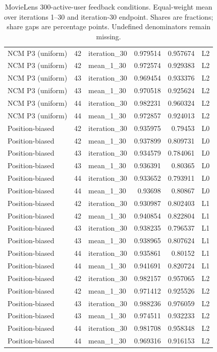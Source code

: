 \begin{table}[htbp!]
\begin{tabular}{lrlrrl}
NCM P3 (uniform) & 42 & iteration\_30 & 0.979514 & 0.957674 & L2 \\
NCM P3 (uniform) & 42 & mean\_1\_30 & 0.972574 & 0.929383 & L2 \\
NCM P3 (uniform) & 43 & iteration\_30 & 0.969454 & 0.933376 & L2 \\
NCM P3 (uniform) & 43 & mean\_1\_30 & 0.970518 & 0.925624 & L2 \\
NCM P3 (uniform) & 44 & iteration\_30 & 0.982231 & 0.960324 & L2 \\
NCM P3 (uniform) & 44 & mean\_1\_30 & 0.972857 & 0.924013 & L2 \\
Position-biased & 42 & iteration\_30 & 0.935975 & 0.79453 & L0 \\
Position-biased & 42 & mean\_1\_30 & 0.937899 & 0.809731 & L0 \\
Position-biased & 43 & iteration\_30 & 0.934579 & 0.784061 & L0 \\
Position-biased & 43 & mean\_1\_30 & 0.936391 & 0.80365 & L0 \\
Position-biased & 44 & iteration\_30 & 0.933652 & 0.793911 & L0 \\
Position-biased & 44 & mean\_1\_30 & 0.93698 & 0.80867 & L0 \\
Position-biased & 42 & iteration\_30 & 0.930987 & 0.802403 & L1 \\
Position-biased & 42 & mean\_1\_30 & 0.940854 & 0.822804 & L1 \\
Position-biased & 43 & iteration\_30 & 0.938235 & 0.796537 & L1 \\
Position-biased & 43 & mean\_1\_30 & 0.938965 & 0.807624 & L1 \\
Position-biased & 44 & iteration\_30 & 0.935861 & 0.80152 & L1 \\
Position-biased & 44 & mean\_1\_30 & 0.941691 & 0.820724 & L1 \\
Position-biased & 42 & iteration\_30 & 0.982157 & 0.957065 & L2 \\
Position-biased & 42 & mean\_1\_30 & 0.971412 & 0.925526 & L2 \\
Position-biased & 43 & iteration\_30 & 0.988236 & 0.976059 & L2 \\
Position-biased & 43 & mean\_1\_30 & 0.974511 & 0.932233 & L2 \\
Position-biased & 44 & iteration\_30 & 0.981708 & 0.958348 & L2 \\
Position-biased & 44 & mean\_1\_30 & 0.969316 & 0.916153 & L2 \\
\hline
\end{tabular}
\caption{MovieLens 300-active-user feedback conditions. Equal-weight mean over iterations 1--30 and iteration-30 endpoint. Shares are fractions; share gaps are percentage points. Undefined denominators remain missing.}
\label{chap:results:tab:rq1_feedback_concentration}
\end{table}
